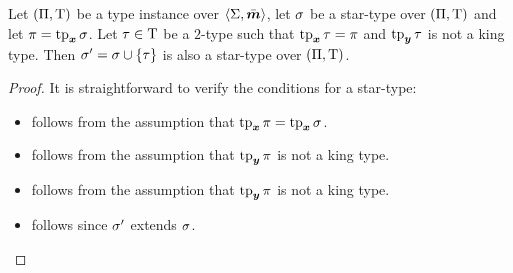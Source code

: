 \begin{remark}\label{rem:star-type-ext}
Let $(\Pi,\mathrm{T})$ be a type instance over $\left\langle \mathrm{\Sigma},\bar{\bm{m}} \right\rangle$,
let $\sigma$ be a star-type over $(\Pi,\mathrm{T})$ and let $\pi = \operatorname{tp}_{\bm{x}}\sigma$.
Let $\tau \in \mathrm{T}$ be a $2$-type such that $\operatorname{tp}_{\bm{x}}\tau = \pi$ and
$\operatorname{tp}_{\bm{y}}\tau$ is not a king type.
Then ${\sigma'} = \sigma \cup \left\{\tau\right\}$ is also a star-type over
$(\Pi,\mathrm{T})$.
\end{remark}
\begin{proof}
It is straightforward to verify the conditions for a star-type:
\begin{itemize}
  \item[\refcondstpx] follows from the assumption that $\operatorname{tp}_{\bm{x}}\pi = \operatorname{tp}_{\bm{x}}\sigma$.
  \item[\refcondstpkx] follows from the assumption that $\operatorname{tp}_{\bm{y}}\pi$ is not a
  king type.
  \item[\refcondstpky] follows from the assumption that $\operatorname{tp}_{\bm{y}}\pi$ is not a
  king type.
  \item[\refcondstpm] follows since ${\sigma'}$ extends $\sigma$.
\end{itemize}
\end{proof}

